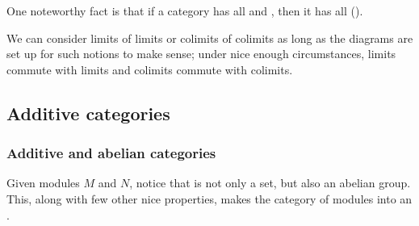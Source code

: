 








One noteworthy fact is that if a category has all  and , then it has all  ().



We can consider limits of limits or colimits of colimits as long as the diagrams are set up for such notions to make sense; under nice enough circumstances, limits commute with limits and colimits commute with colimits.






\subsection{Additive categories}

\subsubsection{Additive and abelian categories}

Given modules $M$ and $N$, notice that  is not only a set, but also an abelian group. This, along with few other nice properties, makes the category of modules into an .

